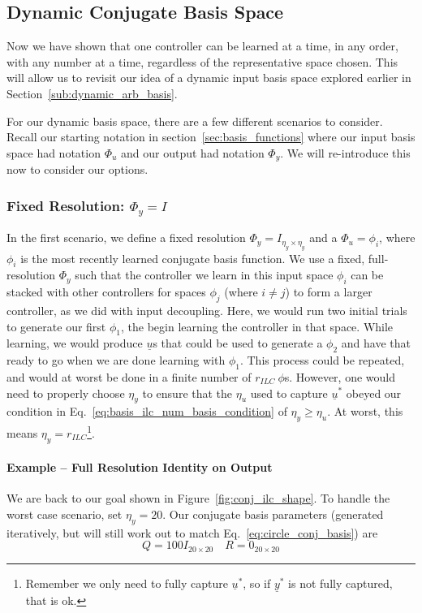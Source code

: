 \FloatBarrier\subsection{Dynamic Conjugate Basis Space}
Now we have shown that one controller can be learned at a time, in any order, with any number at a time, regardless of the representative space chosen. This will allow us to revisit our idea of a dynamic input basis space explored earlier in Section~\ref{sub:dynamic_arb_basis}.

For our dynamic basis space, there are a few different scenarios to consider. Recall our starting notation in section~\ref{sec:basis_functions} where our input basis space had notation $\Phi_u$ and our output had notation $\Phi_y$. We will re-introduce this now to consider our options.

\FloatBarrier\subsubsection{Fixed Resolution: $\Phi_y = I$}
In the first scenario, we define a fixed resolution $\Phi_y = I_{\eta_y \times \eta_y}$ and a $\Phi_u = \phi_i$, where $\phi_i$ is the most recently learned conjugate basis function. 
We use a fixed, full-resolution $\Phi_y$ such that the controller we learn in this input space $\phi_i$ can be stacked with other controllers for spaces $\phi_j$ (where $i \neq j$) to form a larger controller, as we did with input decoupling. 
Here, we would run two initial trials to generate our first $\phi_1$, the begin learning the controller in that space. While learning, we would produce $\underline{u}$s that could be used to generate a $\phi_2$ and have that ready to go when we are done learning with $\phi_1$. 
This process could be repeated, and would at worst be done in a finite number of $r_{ILC} \ \phi$s. However, one would need to properly choose $\eta_y$ to ensure that the $\eta_u$ used to capture $\underline{u}^\ast$ obeyed our condition in Eq.~\ref{eq:basis_ilc_num_basis_condition} of $\eta_y \geq \eta_u$. At worst, this means $\eta_y = r_{ILC}$\footnote{Remember we only need to fully capture $\underline{u}^\ast$, so if $\underline{y}^\ast$ is not fully captured, that is ok.}.

\FloatBarrier\paragraph{Example -- Full Resolution Identity on Output}
We are back to our goal shown in Figure~\ref{fig:conj_ilc_shape}. To handle the worst case scenario, set $\eta_y = 20$. Our conjugate basis parameters (generated iteratively, but will still work out to match Eq.~\ref{eq:circle_conj_basis}) are
\begin{equation}
    Q = 100I_{20 \times 20}
    \quad
    R = 0_{20 \times 20}
\end{equation}

